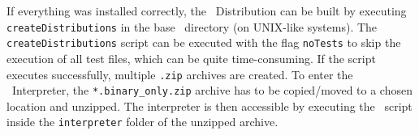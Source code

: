 If everything was installed correctly, the \setlx\ Distribution can be built by executing \lstinline{createDistributions} in the base \setlx\ directory (on UNIX-like systems). The \lstinline{createDistributions} script can be executed with the flag \lstinline{noTests} to skip the execution of all test files, which can be quite time-consuming. If the script executes successfully, multiple \lstinline{.zip} archives are created. To enter the \setlx\ Interpreter, the \lstinline{*.binary_only.zip} archive has to be copied/moved to a chosen location and unzipped. The interpreter is then accessible by executing the \setlx\ script inside the \lstinline{interpreter} folder of the unzipped archive.